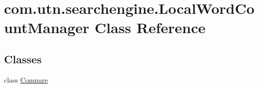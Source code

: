 \hypertarget{classcom_1_1utn_1_1searchengine_1_1_local_word_count_manager}{\section{com.\-utn.\-searchengine.\-Local\-Word\-Count\-Manager \-Class \-Reference}
\label{classcom_1_1utn_1_1searchengine_1_1_local_word_count_manager}
}
\subsection*{\-Classes}
\begin{DoxyCompactItemize}
\item 
class \hyperlink{classcom_1_1utn_1_1searchengine_1_1_local_word_count_manager_1_1_compare}{\-Compare}
\end{DoxyCompactItemize}
